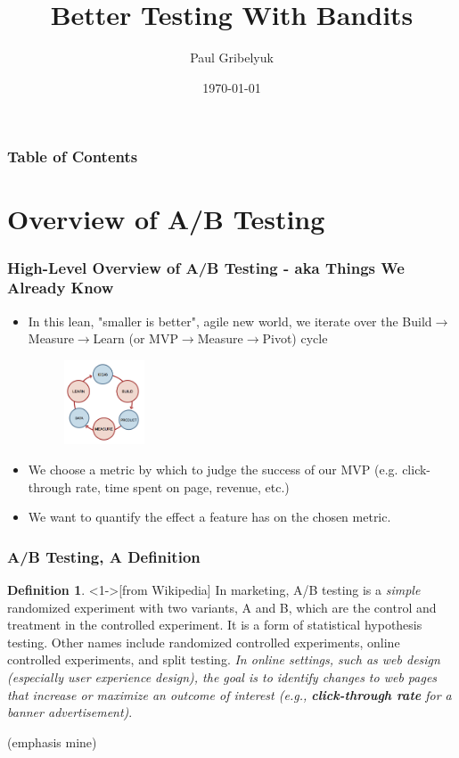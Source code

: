 \documentclass[]{beamer}
\title{Better Testing With Bandits}
\author{Paul Gribelyuk}
\date{\today}
\theoremstyle{definition}
\newtheorem{defn}{Definition}[section]
\begin{document}
\frame{\titlepage}

\begin{frame}
	\frametitle{Table of Contents}
	\tableofcontents
\end{frame}


\section{Overview of A/B Testing}


\begin{frame}
	\frametitle{High-Level Overview of A/B Testing - aka Things We Already Know}
	\begin{itemize}
		\item In this lean, "smaller is better", agile new world, we iterate over the Build$\to$Measure$\to$Learn (or MVP$\to$Measure$\to$Pivot) cycle
		\begin{figure}[h!]
		\centering
			\includegraphics[height=2.5cm]{resources/lean_workflow.png}
		\end{figure}
		\item We choose a metric by which to judge the success of our MVP (e.g. click-through rate, time spent on page, revenue, etc.)
		\item We want to quantify the effect a feature has on the chosen metric.
	\end{itemize}
\end{frame}


\begin{frame}
	\frametitle{A/B Testing, A Definition}

	\begin{defn}<1->[from Wikipedia]
		In marketing, A/B testing is a \emph{simple} randomized experiment with two variants, A and B, which are the control and treatment in the controlled experiment. It is a form of statistical hypothesis testing. Other names include randomized controlled experiments, online controlled experiments, and split testing. \pause\emph{In online settings, such as web design (especially user experience design), the goal is to identify changes to web pages that increase or maximize an outcome of interest (e.g., \textbf{click-through rate} for a banner advertisement)}.
	\end{defn}
	(emphasis mine)
\end{frame}
\end{document}

